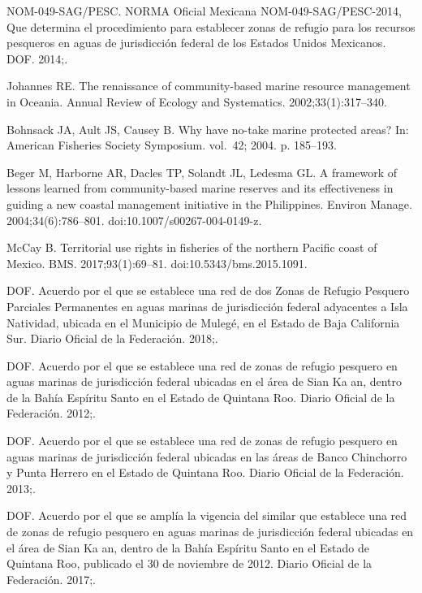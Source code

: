 \documentclass[10pt,letterpaper]{article}
\begin{document}
\begin{thebibliography}{10}
NOM-049-SAG/PESC.
\newblock NORMA Oficial Mexicana NOM-049-SAG/PESC-2014, Que determina el
  procedimiento para establecer zonas de refugio para los recursos pesqueros en
  aguas de jurisdicción federal de los Estados Unidos Mexicanos.
\newblock DOF. 2014;.

Johannes RE.
\newblock The renaissance of community-based marine resource management in
  Oceania.
\newblock Annual Review of Ecology and Systematics. 2002;33(1):317--340.

Bohnsack JA, Ault JS, Causey B.
\newblock Why have no-take marine protected areas?
\newblock In: American Fisheries Society Symposium. vol.~42; 2004. p. 185--193.

Beger M, Harborne AR, Dacles TP, Solandt JL, Ledesma GL.
\newblock A framework of lessons learned from community-based marine reserves
  and its effectiveness in guiding a new coastal management initiative in the
  Philippines.
\newblock Environ Manage. 2004;34(6):786--801.
\newblock doi:{10.1007/s00267-004-0149-z}.

McCay B.
\newblock Territorial use rights in fisheries of the northern Pacific coast of
  Mexico.
\newblock BMS. 2017;93(1):69--81.
\newblock doi:{10.5343/bms.2015.1091}.

DOF.
\newblock Acuerdo por el que se establece una red de dos Zonas de Refugio
  Pesquero Parciales Permanentes en aguas marinas de jurisdicción federal
  adyacentes a Isla Natividad, ubicada en el Municipio de Mulegé, en el Estado
  de Baja California Sur.
\newblock Diario Oficial de la Federación. 2018;.

DOF.
\newblock Acuerdo por el que se establece una red de zonas de refugio pesquero
  en aguas marinas de jurisdicción federal ubicadas en el área de Sian Ka an,
  dentro de la Bahía Espíritu Santo en el Estado de Quintana Roo.
\newblock Diario Oficial de la Federación. 2012;.

DOF.
\newblock Acuerdo por el que se establece una red de zonas de refugio pesquero
  en aguas marinas de jurisdicción federal ubicadas en las áreas de Banco
  Chinchorro y Punta Herrero en el Estado de Quintana Roo.
\newblock Diario Oficial de la Federación. 2013;.

DOF.
\newblock Acuerdo por el que se amplía la vigencia del similar que establece
  una red de zonas de refugio pesquero en aguas marinas de jurisdicción
  federal ubicadas en el área de Sian Ka an, dentro de la Bahía Espíritu
  Santo en el Estado de Quintana Roo, publicado el 30 de noviembre de 2012.
\newblock Diario Oficial de la Federación. 2017;.


\end{thebibliography}
\end{document}

